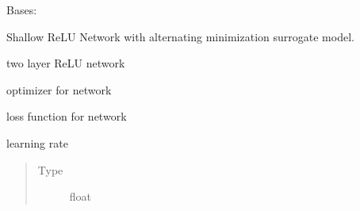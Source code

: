 \documentclass[letterpaper,10pt,english]{sphinxmanual}
\begin{document}
\begin{fulllineitems}
\label{\detokenize{rom:rom.response_surfaces.NN_alt}}
\sphinxAtStartPar
Bases: 

\sphinxAtStartPar
Shallow ReLU Network with alternating minimization surrogate model.

\begin{fulllineitems}
\label{\detokenize{rom:rom.response_surfaces.NN_alt.net}}
\sphinxAtStartPar
two layer ReLU network

\end{fulllineitems}


\begin{fulllineitems}
\label{\detokenize{rom:rom.response_surfaces.NN_alt.optimizer}}
\sphinxAtStartPar
optimizer for network

\end{fulllineitems}


\begin{fulllineitems}
\label{\detokenize{rom:rom.response_surfaces.NN_alt.loss_func}}
\sphinxAtStartPar
loss function for network

\end{fulllineitems}


\begin{fulllineitems}
\label{\detokenize{rom:rom.response_surfaces.NN_alt.lr}}
\sphinxAtStartPar
learning rate
\begin{quote}\begin{description}
\item[{Type}] \leavevmode
\sphinxAtStartPar
float


\end{description}
\end{quote}
\end{fulllineitems}
\end{fulllineitems}
\end{document}
